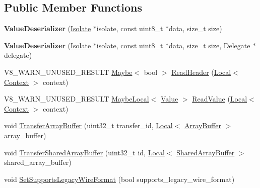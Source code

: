 \subsection*{Public Member Functions}
\begin{DoxyCompactItemize}
\item 
\mbox{\label{classv8_1_1ValueDeserializer_a8ffab323ccaa68672041bb8cb2171187}} 
{\bfseries Value\+Deserializer} (\mbox{\hyperlink{classv8_1_1Isolate}{Isolate}} $\ast$isolate, const uint8\+\_\+t $\ast$data, size\+\_\+t size)
\item 
\mbox{\label{classv8_1_1ValueDeserializer_a122d1594dae10113a3a56a6f924d5c70}} 
{\bfseries Value\+Deserializer} (\mbox{\hyperlink{classv8_1_1Isolate}{Isolate}} $\ast$isolate, const uint8\+\_\+t $\ast$data, size\+\_\+t size, \mbox{\hyperlink{classv8_1_1ValueDeserializer_1_1Delegate}{Delegate}} $\ast$delegate)
\item 
V8\+\_\+\+W\+A\+R\+N\+\_\+\+U\+N\+U\+S\+E\+D\+\_\+\+R\+E\+S\+U\+LT \mbox{\hyperlink{classv8_1_1Maybe}{Maybe}}$<$ bool $>$ \mbox{\hyperlink{classv8_1_1ValueDeserializer_a5b6c24dcdd0fa8b241cf45d058f1270c}{Read\+Header}} (\mbox{\hyperlink{classv8_1_1Local}{Local}}$<$ \mbox{\hyperlink{classv8_1_1Context}{Context}} $>$ context)
\item 
V8\+\_\+\+W\+A\+R\+N\+\_\+\+U\+N\+U\+S\+E\+D\+\_\+\+R\+E\+S\+U\+LT \mbox{\hyperlink{classv8_1_1MaybeLocal}{Maybe\+Local}}$<$ \mbox{\hyperlink{classv8_1_1Value}{Value}} $>$ \mbox{\hyperlink{classv8_1_1ValueDeserializer_ad1697f04cf0fae2f80d5750d6fe9c4da}{Read\+Value}} (\mbox{\hyperlink{classv8_1_1Local}{Local}}$<$ \mbox{\hyperlink{classv8_1_1Context}{Context}} $>$ context)
\item 
void \mbox{\hyperlink{classv8_1_1ValueDeserializer_a853acc2c7b30571d6719ddd92a48da3b}{Transfer\+Array\+Buffer}} (uint32\+\_\+t transfer\+\_\+id, \mbox{\hyperlink{classv8_1_1Local}{Local}}$<$ \mbox{\hyperlink{classv8_1_1ArrayBuffer}{Array\+Buffer}} $>$ array\+\_\+buffer)
\item 
void \mbox{\hyperlink{classv8_1_1ValueDeserializer_a3730fe24f81054d6f75a1b23f77a0e6c}{Transfer\+Shared\+Array\+Buffer}} (uint32\+\_\+t id, \mbox{\hyperlink{classv8_1_1Local}{Local}}$<$ \mbox{\hyperlink{classv8_1_1SharedArrayBuffer}{Shared\+Array\+Buffer}} $>$ shared\+\_\+array\+\_\+buffer)
\item 
void \mbox{\hyperlink{classv8_1_1ValueDeserializer_a076d92b67d68c64404f1065d0dcd85b6}{Set\+Supports\+Legacy\+Wire\+Format}} (bool supports\+\_\+legacy\+\_\+wire\+\_\+format)

\end{DoxyCompactItemize}
